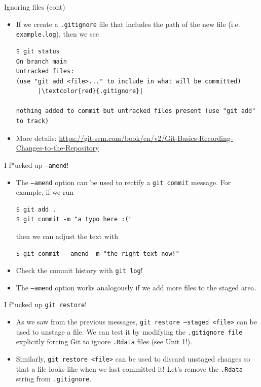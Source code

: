 \documentclass[
hyperref={bookmarks=false},
xcolor={dvipsnames,svgnames*,x11names*}, 
12pt
]{beamer}
\begin{document}
\begin{frame}[fragile]{Ignoring files (cont)}
\vspace{-0.5cm}
\begin{itemize}
\itemsep 2ex
\item If we create a \texttt{.gitignore} file that includes the path of the new file (i.e. \texttt{example.log}), then we see
\begin{lstlisting}
$ git status
On branch main
Untracked files:
(use "git add <file>..." to include in what will be committed)
      |\textcolor{red}{.gitignore}|

nothing added to commit but untracked files present (use "git add" to track)
\end{lstlisting}
\item More details: \url{https://git-scm.com/book/en/v2/Git-Basics-Recording-Changes-to-the-Repository}
\end{itemize}
\end{frame}

\begin{frame}[fragile]{I f*ucked up  \texttt{--amend}!}
\vspace{-0.5cm}
\begin{itemize}
\itemsep 2ex
\item The \texttt{--amend} option can be used to rectify a \texttt{git commit} message. For example, if we run
\begin{lstlisting}
$ git add . 
$ git commit -m "a typo here :("
\end{lstlisting} 
then we can adjust the text with
\begin{lstlisting}
$ git commit --amend -m "the right text now!"
\end{lstlisting}
\item Check the commit history with \texttt{git log}!
\item The \texttt{--amend} option works analogously if we add more files to the staged area. 
\end{itemize}
\end{frame}

\begin{frame}[fragile]{I f*ucked up  \texttt{git restore}!}
\vspace{-0.5cm}
\begin{itemize}
\itemsep 2ex
\item As we saw from the previous messages, \texttt{git restore --staged <file>} can be used to unstage a file. We can test it by modifying the \texttt{.gitignore file} explicitly forcing Git to ignore \texttt{.Rdata} files (see Unit 1!).
\item Similarly, \texttt{git restore <file>} can be used to discard unstaged changes so that a file looks like when we last committed it! Let's remove the \texttt{.Rdata} string from \texttt{.gitignore}. 
\end{itemize}
\end{frame}
\end{document}
